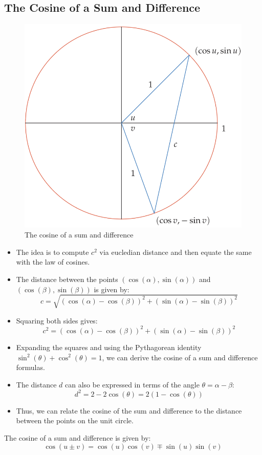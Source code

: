\subsection{The Cosine of a Sum and Difference}
\begin{figure}
    \centering
    \includegraphics[scale=0.4]{pics/37.png}
    \caption{The cosine of a sum and difference}
\end{figure}
\begin{itemize}
    \item The idea is to compute $c^2$ via eucledian distance and then equate the same with the law of cosines.
    \item The distance between the points $(\cos(\alpha), \sin(\alpha))$ and $(\cos(\beta), \sin(\beta))$ is given by:
    \[ c = \sqrt{(\cos(\alpha) - \cos(\beta))^2 + (\sin(\alpha) - \sin(\beta))^2} \]
    \item Squaring both sides gives:
    \[ c^2 = (\cos(\alpha) - \cos(\beta))^2 + (\sin(\alpha) - \sin(\beta))^2 \]
    \item Expanding the squares and using the Pythagorean identity $\sin^2(\theta) + \cos^2(\theta) = 1$, we can derive the cosine of a sum and difference formulas.
    \item The distance $d$ can also be expressed in terms of the angle $\theta = \alpha - \beta$:
    \[ d^2 = 2 - 2\cos(\theta) = 2(1 - \cos(\theta)) \]
    \item Thus, we can relate the cosine of the sum and difference to the distance between the points on the unit circle.
\end{itemize}
The cosine of a sum and difference is given by:
\[ \cos( u \pm v) = \cos(u)\cos(v) \mp \sin(u)\sin(v) \]

